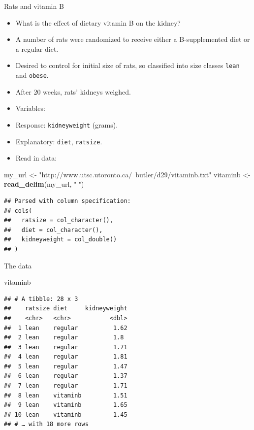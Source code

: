 \documentclass[ignorenonframetext,]{beamer}
\newenvironment{Shaded}{\begin{snugshade}}{\end{snugshade}}
\newcommand{\KeywordTok}[1]{\textcolor[rgb]{0.13,0.29,0.53}{\textbf{#1}}}
\newcommand{\NormalTok}[1]{#1}
\newcommand{\StringTok}[1]{\textcolor[rgb]{0.31,0.60,0.02}{#1}}
\begin{document}
\begin{frame}[fragile]{Rats and vitamin B}
\protect\hypertarget{rats-and-vitamin-b}{}

\begin{itemize}
\item
  What is the effect of dietary vitamin B on the kidney?
\item
  A number of rats were randomized to receive either a B-supplemented
  diet or a regular diet.
\item
  Desired to control for initial size of rats, so classified into size
  classes \texttt{lean} and \texttt{obese}.
\item
  After 20 weeks, rats' kidneys weighed.
\item
  Variables:
\item
  Response: \texttt{kidneyweight} (grams).
\item
  Explanatory: \texttt{diet}, \texttt{ratsize}.
\item
  Read in data:
\end{itemize}

\begin{Shaded}
\begin{Highlighting}[]
\NormalTok{my_url <-}\StringTok{ "http://www.utsc.utoronto.ca/~butler/d29/vitaminb.txt"}
\NormalTok{vitaminb <-}\StringTok{ }\KeywordTok{read_delim}\NormalTok{(my_url, }\StringTok{" "}\NormalTok{)}
\end{Highlighting}
\end{Shaded}

\begin{verbatim}
## Parsed with column specification:
## cols(
##   ratsize = col_character(),
##   diet = col_character(),
##   kidneyweight = col_double()
## )
\end{verbatim}

\end{frame}

\begin{frame}[fragile]{The data}
\protect\hypertarget{the-data-7}{}

\begin{Shaded}
\begin{Highlighting}[]
\NormalTok{vitaminb}
\end{Highlighting}
\end{Shaded}

\begin{verbatim}
## # A tibble: 28 x 3
##    ratsize diet     kidneyweight
##    <chr>   <chr>           <dbl>
##  1 lean    regular          1.62
##  2 lean    regular          1.8 
##  3 lean    regular          1.71
##  4 lean    regular          1.81
##  5 lean    regular          1.47
##  6 lean    regular          1.37
##  7 lean    regular          1.71
##  8 lean    vitaminb         1.51
##  9 lean    vitaminb         1.65
## 10 lean    vitaminb         1.45
## # … with 18 more rows
\end{verbatim}

\end{frame}
\end{document}
